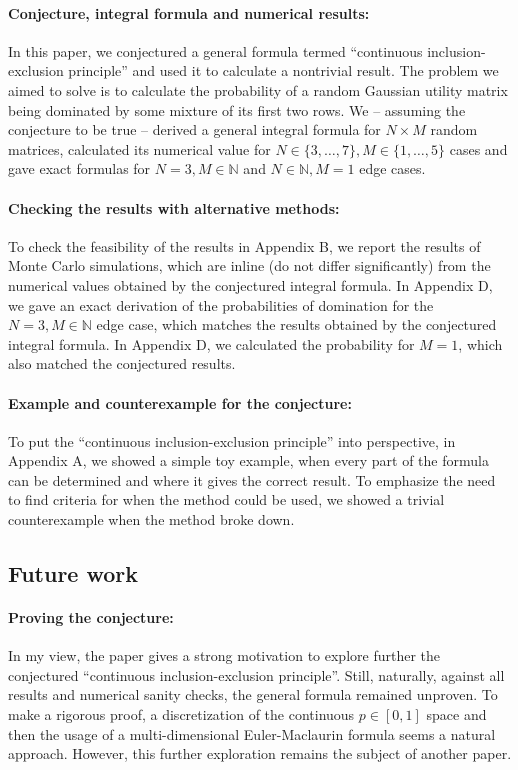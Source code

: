 \documentclass{article}
\theoremstyle{definition}
\begin{document}
\paragraph{Conjecture, integral formula and numerical results:}
In this paper, we conjectured a general formula termed  ``continuous
inclusion-exclusion principle'' and used it to calculate a nontrivial result.
The problem we aimed to solve is to calculate the probability of a random Gaussian utility matrix being dominated by some mixture of its first two rows.
We -- assuming the conjecture to be true -- derived a general integral formula for $N\times M$ random matrices, calculated its numerical value for $N \in \{3,\dots,7\}, M \in \{1,\dots,5\}$ cases and gave exact formulas for $N=3, M \in \mathbb{N}$ and $N \in \mathbb{N}, M=1$ edge cases.

\paragraph{Checking the results with alternative methods:}
To check the feasibility of the results in Appendix B, we report the results of Monte Carlo simulations, which are inline (do not differ significantly) from the numerical values obtained by the conjectured integral formula.
In Appendix D, we gave an exact derivation of the probabilities of domination for the $N=3, M \in \mathbb{N}$ edge case, which matches the results obtained by the conjectured integral formula. In Appendix D, we calculated the probability for $M=1$, which also matched the conjectured results.

\paragraph{Example and counterexample for the conjecture:}
To put the ``continuous inclusion-exclusion principle'' into perspective, in Appendix A, we showed a simple toy example, when every part of the formula can be determined and where it gives the correct result. To emphasize the need to find criteria for when the method could be used, we showed a trivial counterexample when the method broke down.

\subsection{Future work}

\paragraph{Proving the conjecture:}
In my view, the paper gives a strong motivation to explore further the conjectured ``continuous inclusion-exclusion principle''. Still, naturally, against all results and numerical sanity checks, the general formula remained unproven.
To make a rigorous proof, a discretization of the continuous $p\in [0,1]$ space and then the usage of a multi-dimensional Euler-Maclaurin formula \cite{aper:MultyDimEylerMaclaurin01,paper:MultyDimEylerMaclaurin02}  seems a natural approach. However, this further exploration remains the subject of another paper.
\end{document}
